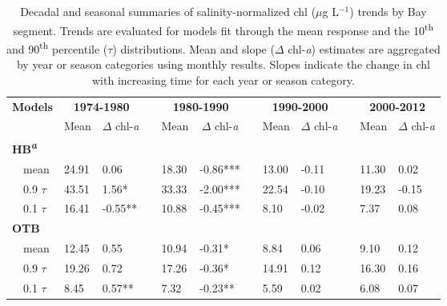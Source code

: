 \documentclass{svjour3}\usepackage[]{graphicx}\usepackage[]{color}
\newcommand{\mugl}{$\mu$g L$^{-1}$}
\begin{document}
\begin{table}[!tbp]
\caption{Decadal and seasonal summaries of salinity-normalized \ac{chl} (\mugl) trends by Bay segment. Trends are evaluated for models fit through the mean response and the 10\textsuperscript{th} and 90\textsuperscript{th} percentile ($\tau$) distributions.  Mean and slope ($\Delta$ chl-\textit{a}) estimates are aggregated by year or season categories using monthly results.  Slopes indicate the change in \ac{chl} with increasing time for each year or season category.\label{tab:trendsal}} 
\begin{center}
\begin{tabular}{lllcllcllcll}
\hline\hline
\multicolumn{1}{l}{\bfseries Models}&\multicolumn{2}{c}{\bfseries {\bf 1974-1980}}&\multicolumn{1}{c}{\bfseries }&\multicolumn{2}{c}{\bfseries {\bf 1980-1990}}&\multicolumn{1}{c}{\bfseries }&\multicolumn{2}{c}{\bfseries {\bf 1990-2000}}&\multicolumn{1}{c}{\bfseries }&\multicolumn{2}{c}{\bfseries {\bf 2000-2012}}\tabularnewline
\cline{2-3} \cline{5-6} \cline{8-9} \cline{11-12}
\multicolumn{1}{l}{}&\multicolumn{1}{c}{Mean}&\multicolumn{1}{c}{$\Delta$ chl-\textit{a}}&\multicolumn{1}{c}{}&\multicolumn{1}{c}{Mean}&\multicolumn{1}{c}{$\Delta$ chl-\textit{a}}&\multicolumn{1}{c}{}&\multicolumn{1}{c}{Mean}&\multicolumn{1}{c}{$\Delta$ chl-\textit{a}}&\multicolumn{1}{c}{}&\multicolumn{1}{c}{Mean}&\multicolumn{1}{c}{$\Delta$ chl-\textit{a}}\tabularnewline
\hline
{\bfseries HB\textsuperscript{\textit{a}}}&&&&&&&&&&&\tabularnewline
~~mean&24.91& 0.06 &&18.30&-0.86***&&13.00&-0.11 &&11.30& 0.02 \tabularnewline
~~0.9 $\tau$&43.51& 1.56*&&33.33&-2.00***&&22.54&-0.10 &&19.23&-0.15 \tabularnewline
~~0.1 $\tau$&16.41&-0.55**&&10.88&-0.45***&& 8.10&-0.02 && 7.37& 0.08 \tabularnewline
\hline
{\bfseries OTB}&&&&&&&&&&&\tabularnewline
~~mean&12.45& 0.55 &&10.94&-0.31*&& 8.84& 0.06 && 9.10& 0.12 \tabularnewline
~~0.9 $\tau$&19.26& 0.72 &&17.26&-0.36*&&14.91& 0.12 &&16.30& 0.16 \tabularnewline
~~0.1 $\tau$& 8.45& 0.57**&& 7.32&-0.23**&& 5.59& 0.02 && 6.08& 0.07 \tabularnewline

\end{tabular}
\end{center}
\end{table}
\end{document}
